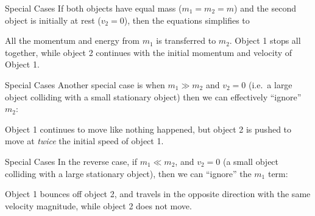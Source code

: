 \documentclass[12pt,compress,aspectratio=169]{beamer}
\begin{document}
\begin{frame}{Special Cases}
  If both objects have equal mass ($m_1=m_2=m$) and the second object is
  initially at rest ($v_2=0$), then the equations simplifies to
  

  All the momentum and energy from $m_1$ is transferred to $m_2$. Object 1
  stops all together, while object 2 continues with the initial momentum and
  velocity of Object 1.
\end{frame}



\begin{frame}{Special Cases}
  Another special case is when $m_1\gg m_2$ and $v_2=0$ (i.e.\ a large object
  colliding with a small stationary object) then we can effectively ``ignore''
  $m_2$:
  

  Object 1 continues to move like nothing happened, but object 2 is pushed to
  move at \emph{twice} the initial speed of object 1.
\end{frame}



\begin{frame}{Special Cases}
  In the reverse case, if $m_1\ll m_2$, and $v_2=0$ (a small object colliding
  with a large stationary object), then we can ``ignore'' the $m_1$ term:
  

  Object 1 bounces off object 2, and travels in the opposite direction with the
  same velocity magnitude, while object 2 does not move.
\end{frame}
\end{document}
